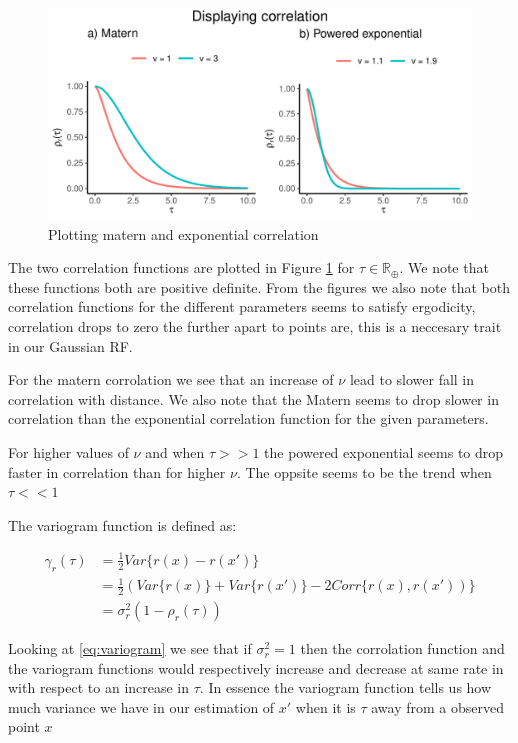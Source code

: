 \documentclass[]{article}
\begin{document}
\begin{figure}
\centering
\includegraphics{Exercise_1_files/figure-latex/fig1a1-1.pdf}
\caption{\label{fig:fig1a1} Plotting matern and exponential correlation}
\end{figure}

The two correlation functions are plotted in Figure \ref{fig:fig1a1} for
\(\tau \in \mathbb{R}_\oplus\). We note that these functions both are
positive definite. From the figures we also note that both correlation
functions for the different parameters seems to satisfy ergodicity,
correlation drops to zero the further apart to points are, this is a
neccesary trait in our Gaussian RF.

For the matern corrolation we see that an increase of \(\nu\) lead to
slower fall in correlation with distance. We also note that the Matern
seems to drop slower in correlation than the exponential correlation
function for the given parameters.

For higher values of \(\nu\) and when \(\tau >> 1\) the powered
exponential seems to drop faster in correlation than for higher \(\nu\).
The oppsite seems to be the trend when \(\tau << 1\)

The variogram function is defined as:

\begin{equation}\label{eq:variogram}
    \begin{split}
        \gamma_r(\tau)  &= \frac{1}{2} Var\lbrace r(x) - r(x') \rbrace \\
        &= \frac{1}{2} (Var\lbrace r(x) \rbrace + Var\lbrace r(x') \rbrace - 2 Corr\lbrace r(x), r(x')) \rbrace\\
        &=\sigma_r^2(1-\rho_r(\tau))
    \end{split}
\end{equation}

Looking at \eqref{eq:variogram} we see that if \(\sigma_r^2 = 1\) then
the corrolation function and the variogram functions would respectively
increase and decrease at same rate in with respect to an increase in
\(\tau\). In essence the variogram function tells us how much variance
we have in our estimation of \(x'\) when it is \(\tau\) away from a
observed point \(x\)
\end{document}

